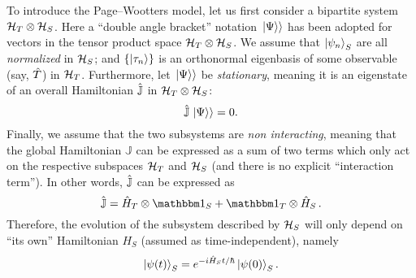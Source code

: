 To introduce the Page--Wootters model, let us first consider
a bipartite system $\mathcal{H}_T \otimes \mathcal{H}_S$.
Here
a ``double angle bracket'' notation $\left.\left| \Psi \right\rangle\right\rangle$ has been adopted
for vectors in the tensor product space $\mathcal{H}_T \otimes \mathcal{H}_S$.
We assume that $\ket{\psi_{n}}_{S}$ are all \emph{normalized} in $\mathcal{H}_S$;
and
$\qty{\ket{{\tau}_n}}$ is an orthonormal eigenbasis of some observable (say, $\hat{T}$)
in $\mathcal{H}_T$.
Furthermore, let $\left.\left| \Psi \right\rangle\right\rangle$ be \emph{stationary}, meaning it is an eigenstate
of an overall Hamiltonian $\hat{\mathbb{J}}$ in $\mathcal{H}_T \otimes \mathcal{H}_S$:
\begin{equation}\label{eq:Wheeler-DeWitt}  %
  \op{\mathbb{J}} \dket{\Psi} = 0 \text{.}
\end{equation}
Finally, we assume that the two subsystems
are \emph{non interacting},
meaning that the global Hamiltonian $\mathbb{J}$ can be expressed as a sum of two terms
which only act on the respective subspaces $\mathcal{H}_T$ and $\mathcal{H}_S$
(and there is no explicit ``interaction term''). In other words,
$\hat{\mathbb{J}}$ can be expressed as
\begin{equation}\label{eq:pwHamiltonian}
  \op{\mathbb{J}} = \op{H}_T \ox \idop_S + \idop_T \ox \op{H}_S \, \text{.} 
\end{equation}
Therefore,
the evolution of the subsystem described by $\mathcal{H}_S$
will only depend on ``its own''
Hamiltonian $H_S$ (assumed as time-independent), namely
\begin{equation}\label{eq:pw:ordinary_S}
  \ket{\psi(t)}_S = e^{- i \hat{H}_S t / \hbar} \ket{\psi(0)}_S \text{.}  
\end{equation}
 
